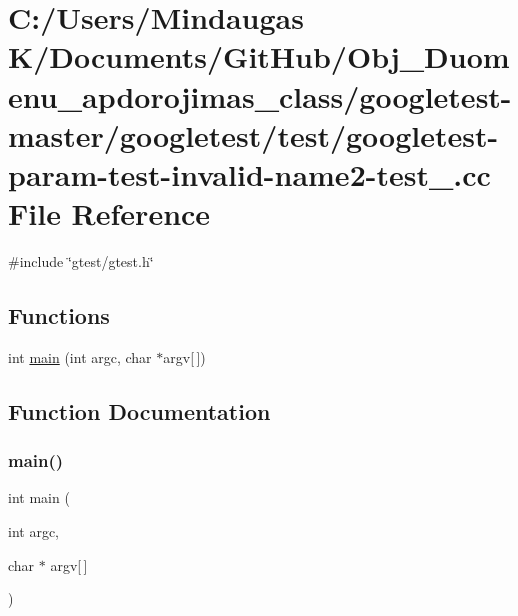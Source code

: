 \hypertarget{googletest-master_2googletest_2test_2googletest-param-test-invalid-name2-test___8cc}{}\section{C\+:/\+Users/\+Mindaugas K/\+Documents/\+Git\+Hub/\+Obj\+\_\+\+Duomenu\+\_\+apdorojimas\+\_\+class/googletest-\/master/googletest/test/googletest-\/param-\/test-\/invalid-\/name2-\/test\+\_\+.cc File Reference}
\label{googletest-master_2googletest_2test_2googletest-param-test-invalid-name2-test___8cc}
{\ttfamily \#include \char`\"{}gtest/gtest.\+h\char`\"{}}\newline
\subsection*{Functions}
\begin{DoxyCompactItemize}
\item 
int \mbox{\hyperlink{googletest-master_2googletest_2test_2googletest-param-test-invalid-name2-test___8cc_a0ddf1224851353fc92bfbff6f499fa97}{main}} (int argc, char $\ast$argv\mbox{[}$\,$\mbox{]})
\end{DoxyCompactItemize}


\subsection{Function Documentation}
\mbox{\label{googletest-master_2googletest_2test_2googletest-param-test-invalid-name2-test___8cc_a0ddf1224851353fc92bfbff6f499fa97}} 
\subsubsection{\texorpdfstring{main()}{main()}}
{\footnotesize\ttfamily int main (\begin{DoxyParamCaption}\item[{int}]{argc,  }\item[{char $\ast$}]{argv\mbox{[}$\,$\mbox{]} }\end{DoxyParamCaption})}

